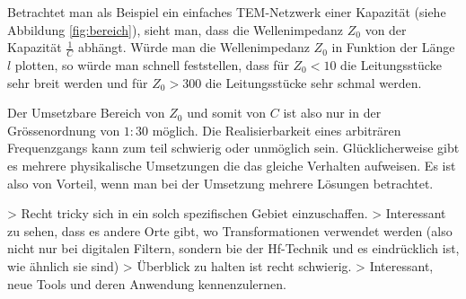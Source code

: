 Betrachtet  man als Beispiel  ein  einfaches  TEM-Netzwerk  einer  Kapazit\"at
(siehe Abbildung \ref{fig:bereich}), sieht man, dass die  Wellenimpedanz $Z_0$
von  der Kapazit\"at $\frac{1}{C}$ abh\"angt. W\"urde man  die  Wellenimpedanz
$Z_0$ in Funktion der L\"ange $l$ plotten, so w\"urde man schnell feststellen,
dass f\"ur $Z_0<10$ die Leitungsst\"ucke sehr breit werden und  f\"ur  $Z_0  >
300$ die Leitungsst\"ucke sehr schmal werden.

Der Umsetzbare Bereich von $Z_0$ und  somit  von  $C$  ist  also  nur  in  der
Gr\"ossenordnung von $1:30$ m\"oglich. Die Realisierbarkeit eines arbitr\"aren
Frequenzgangs    kann    zum    teil   schwierig   oder   unm\"oglich    sein.
Gl\"ucklicherweise gibt es  mehrere  physikalische Umsetzungen die das gleiche
Verhalten aufweisen.  Es  ist  also  von  Vorteil,  wenn man bei der Umsetzung
mehrere L\"osungen betrachtet.

> Recht tricky sich in ein solch spezifischen Gebiet einzuschaffen. 
> Interessant zu sehen, dass es andere Orte gibt, wo Transformationen verwendet werden (also nicht nur bei digitalen Filtern, sondern bie der Hf-Technik und es eindrücklich ist, wie ähnlich sie sind)
> Überblick zu halten ist recht schwierig.
> Interessant, neue Tools und deren Anwendung kennenzulernen.

